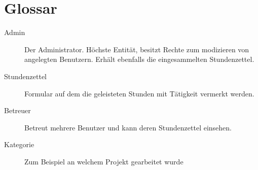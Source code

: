 \section{Glossar}
\begin{description}
	\item[Admin] Der Administrator. Höchste Entität, besitzt Rechte zum modizieren von angelegten Benutzern.
	               Erhält ebenfalls die eingesammelten Stundenzettel.

	\item[Stundenzettel] Formular auf dem die geleisteten Stunden mit Tätigkeit vermerkt werden.

	\item[Betreuer] Betreut mehrere Benutzer und kann deren Stundenzettel einsehen.

	\item[Kategorie] Zum Beispiel an welchem Projekt gearbeitet wurde
\end{description}
